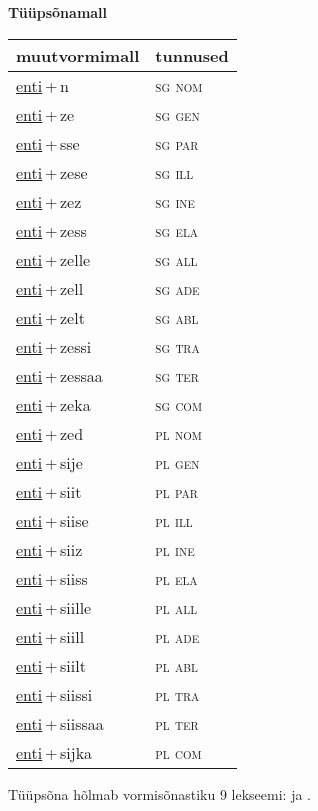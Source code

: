 
\vspace{1.8em}
\begin{minipage}{\textwidth}
\textbf{Tüüpsõnamall \,}\\

\begin{sideways}
\begin{tabular}{l l}
muutvormimall & tunnused \\
\hline
\underline{enti}\,+\,n & \textsc{ sg nom } \\
\underline{enti}\,+\,ze & \textsc{ sg gen } \\
\underline{enti}\,+\,sse & \textsc{ sg par } \\
\underline{enti}\,+\,zese & \textsc{ sg ill } \\
\underline{enti}\,+\,zez & \textsc{ sg ine } \\
\underline{enti}\,+\,zess & \textsc{ sg ela } \\
\underline{enti}\,+\,zelle & \textsc{ sg all } \\
\underline{enti}\,+\,zell & \textsc{ sg ade } \\
\underline{enti}\,+\,zelt & \textsc{ sg abl } \\
\underline{enti}\,+\,zessi & \textsc{ sg tra } \\
\underline{enti}\,+\,zessaa & \textsc{ sg ter } \\
\underline{enti}\,+\,zeka & \textsc{ sg com } \\
\underline{enti}\,+\,zed & \textsc{ pl nom } \\
\underline{enti}\,+\,sije & \textsc{ pl gen } \\
\underline{enti}\,+\,siit & \textsc{ pl par } \\
\underline{enti}\,+\,siise & \textsc{ pl ill } \\
\underline{enti}\,+\,siiz & \textsc{ pl ine } \\
\underline{enti}\,+\,siiss & \textsc{ pl ela } \\
\underline{enti}\,+\,siille & \textsc{ pl all } \\
\underline{enti}\,+\,siill & \textsc{ pl ade } \\
\underline{enti}\,+\,siilt & \textsc{ pl abl } \\
\underline{enti}\,+\,siissi & \textsc{ pl tra } \\
\underline{enti}\,+\,siissaa & \textsc{ pl ter } \\
\underline{enti}\,+\,sijka & \textsc{ pl com } \\
\end{tabular}
\end{sideways}
\label{tab:tüüpsõnamall-entin}

\end{minipage}

 
\vspace{1em}
\noindent Tüüpsõna hõlmab vormisõnastiku 9 lekseemi:  ja .
